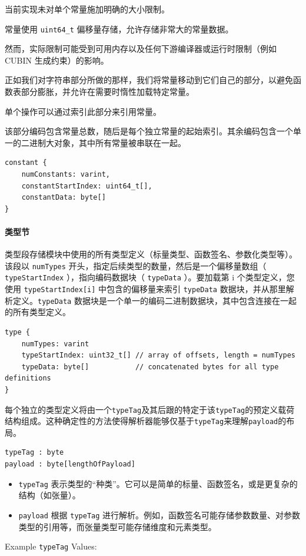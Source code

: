 \documentclass{article}
\begin{document}
当前实现未对单个常量施加明确的大小限制。

常量使用 \texttt{uint64\_t} 偏移量存储，允许存储非常大的常量数据。

然而，实际限制可能受到可用内存以及任何下游编译器或运行时限制（例如 CUBIN 生成约束）的影响。


正如我们对字符串部分所做的那样，我们将常量移动到它们自己的部分，以避免函数表部分膨胀，并允许在需要时惰性加载特定常量。

单个操作可以通过索引此部分来引用常量。

该部分编码包含常量总数，随后是每个独立常量的起始索引。其余编码包含一个单一的二进制大对象，其中所有常量被串联在一起。


\begin{lstlisting}
constant {
    numConstants: varint,
    constantStartIndex: uint64_t[],
    constantData: byte[]
}
\end{lstlisting}


\paragraph{类型节}

类型段存储模块中使用的所有类型定义（标量类型、函数签名、参数化类型等）。该段以 \texttt{numTypes} 开头，指定后续类型的数量，然后是一个偏移量数组（ \texttt{typeStartIndex} ），指向编码数据块（ \texttt{typeData} ）。要加载第 i 个类型定义，您使用 \texttt{typeStartIndex[i]} 中包含的偏移量来索引 \texttt{typeData} 数据块，并从那里解析定义。\texttt{typeData} 数据块是一个单一的编码二进制数据块，其中包含连接在一起的所有类型定义。


\begin{lstlisting}
type {
    numTypes: varint
    typeStartIndex: uint32_t[] // array of offsets, length = numTypes
    typeData: byte[]           // concatenated bytes for all type definitions
}
\end{lstlisting}

每个独立的类型定义将由一个\texttt{typeTag}及其后跟的特定于该\texttt{typeTag}的预定义载荷结构组成。这种确定性的方法使得解析器能够仅基于\texttt{typeTag}来理解\texttt{payload}的布局。


\begin{lstlisting}
typeTag : byte
payload : byte[lengthOfPayload]
\end{lstlisting}

\begin{itemize}
\item \texttt{typeTag} 表示类型的``种类''。它可以是简单的标量、函数签名，或是更复杂的结构（如张量）。
\item \texttt{payload} 根据 \texttt{typeTag} 进行解析。例如，函数签名可能存储参数数量、对参数类型的引用等，而张量类型可能存储维度和元素类型。

\end{itemize}
Example \texttt{typeTag} Values:
\end{document}
